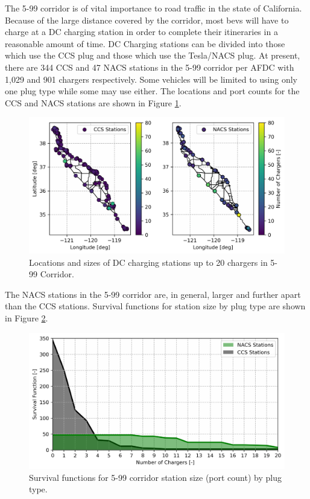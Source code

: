 The 5-99 corridor is of vital importance to road traffic in the state of California. Because of the large distance covered by the corridor, most \glspl{bev} will have to charge at a DC charging station in order to complete their itineraries in a reasonable amount of time. DC Charging stations can be divided into those which use the CCS plug and those which use the Tesla/NACS plug. At present, there are 344 CCS and 47 NACS stations in the 5-99 corridor per AFDC \citep{afdc_2023} with 1,029 and 901 chargers respectively. Some vehicles will be limited to using only one plug type while some may use either. The locations and port counts for the CCS and NACS stations are shown in Figure \ref{fig:stations_corridor}.

\begin{figure}[H]
	\centering
	\includegraphics[width = \figurewidth]{./figures/stations_corridor.png}
	\caption{Locations and sizes of DC charging stations up to 20 chargers in 5-99 Corridor.}
	\label{fig:stations_corridor}
\end{figure}

The NACS stations in the 5-99 corridor are, in general, larger and further apart than the CCS stations. Survival functions for station size by plug type are shown in Figure \ref{fig:stations_survival}.

\begin{figure}[H]
	\centering
	\includegraphics[width = \figurewidth]{./figures/stations_survival.png}
	\caption{Survival functions for 5-99 corridor station size (port count) by plug type.}
	\label{fig:stations_survival}
\end{figure}

